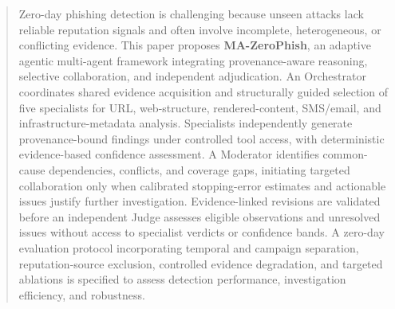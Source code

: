 \begin{abstract}
Zero-day phishing detection is challenging
because unseen attacks lack reliable reputation
signals and often involve incomplete, heterogeneous,
or conflicting evidence. This paper proposes
\textbf{MA-ZeroPhish}, an adaptive agentic
multi-agent framework integrating provenance-aware
reasoning, selective collaboration, and independent
adjudication. An Orchestrator coordinates shared
evidence acquisition and structurally guided
selection of five specialists for URL,
web-structure, rendered-content, SMS/email,
and infrastructure-metadata analysis.
Specialists independently generate
provenance-bound findings under controlled
tool access, with deterministic evidence-based
confidence assessment. A Moderator identifies
common-cause dependencies, conflicts, and
coverage gaps, initiating targeted collaboration
only when calibrated stopping-error estimates
and actionable issues justify further
investigation. Evidence-linked revisions
are validated before an independent Judge
assesses eligible observations and unresolved
issues without access to specialist verdicts
or confidence bands. A zero-day evaluation
protocol incorporating temporal and campaign
separation, reputation-source exclusion,
controlled evidence degradation, and targeted
ablations is specified to assess detection
performance, investigation efficiency,
and robustness.
\end{abstract}
